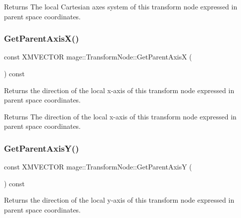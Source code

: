 \begin{DoxyReturn}{Returns}
The local Cartesian axes system of this transform node expressed in parent space coordinates. 
\end{DoxyReturn}
\hypertarget{structmage_1_1_transform_node_ac562bb1036c0bc55c0ededd8fa956fda}{}\label{structmage_1_1_transform_node_ac562bb1036c0bc55c0ededd8fa956fda} 
\subsubsection{\texorpdfstring{Get\+Parent\+Axis\+X()}{GetParentAxisX()}}
{\footnotesize\ttfamily const X\+M\+V\+E\+C\+T\+OR mage\+::\+Transform\+Node\+::\+Get\+Parent\+AxisX (\begin{DoxyParamCaption}{ }\end{DoxyParamCaption}) const\hspace{0.3cm}{\ttfamily [noexcept]}}

Returns the direction of the local x-\/axis of this transform node expressed in parent space coordinates.

\begin{DoxyReturn}{Returns}
The direction of the local x-\/axis of this transform node expressed in parent space coordinates. 
\end{DoxyReturn}
\hypertarget{structmage_1_1_transform_node_a5d5138bb149828fa78da166129f996b1}{}\label{structmage_1_1_transform_node_a5d5138bb149828fa78da166129f996b1} 
\subsubsection{\texorpdfstring{Get\+Parent\+Axis\+Y()}{GetParentAxisY()}}
{\footnotesize\ttfamily const X\+M\+V\+E\+C\+T\+OR mage\+::\+Transform\+Node\+::\+Get\+Parent\+AxisY (\begin{DoxyParamCaption}{ }\end{DoxyParamCaption}) const\hspace{0.3cm}{\ttfamily [noexcept]}}

Returns the direction of the local y-\/axis of this transform node expressed in parent space coordinates.

